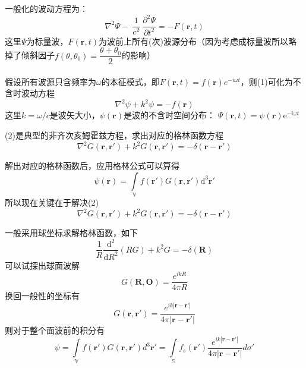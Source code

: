 \begin{slide}
    一般化的波动方程为：
    \begin{equation}
        \nabla^2 \Psi -\ \frac{1}{c^2}\ \frac{\partial^2 \Psi}{\partial t^2 }
        = - F(\bm{r},t)
    \end{equation}
    这里$\Psi$为标量波，$F(\bm{r},t)$为波前上所有(次)波源分布（因为考虑成标量波所以略掉了倾斜因子$f(\theta,\theta_0)=\dfrac{\theta+\theta_0}{2}$的影响）\\~\\
    假设所有波源只含频率为$\omega$的本征模式，即$F(\bm{r},t)=f(\bm{r})e^{-i\omega t}$，则(1)可化为不含时波动方程
    \begin{equation}
        \nabla^2 \psi + k^2 \psi = -  f(\bm{r})
    \end{equation}
    这里$k=\omega/c$是波矢大小，$\psi(\bm{r})$是波的不含时空间分布：
    $\Psi(\bm{r},t)=\psi(\bm{r})\mathrm{e}^{-i\omega t}$
\end{slide}

\begin{slide}
    (2)是典型的非齐次亥姆霍兹方程，求出对应的格林函数方程
    \begin{equation}
        \nabla^2 G(\bm{r},\bm{r}') + k^2 G(\bm{r},\bm{r}')
        = -\delta(\bm{r}-\bm{r}')
    \end{equation}

    解出对应的格林函数后，应用格林公式可以算得
    \begin{equation}
        \psi(\bm{r}) = \int\limits_{\mathbb{V}}f(\bm{r}')G(\bm{r},\bm{r}') \mathrm{d}^3\bm{r}'
    \end{equation}
    所以现在关键在于解决(2)
    \begin{equation*}
        \nabla^2 G(\bm{r},\bm{r}') + k^2 G(\bm{r},\bm{r}')
        = -\delta(\bm{r}-\bm{r}')
    \end{equation*}
\end{slide}

\begin{slide}
    一般采用球坐标求解格林函数，如下
    \begin{equation}
        \frac{1}{R} \frac {\mathrm{d}^2}{\mathrm{d} R^2} (RG) +k^2 G
        = -\delta(\bm{R})
    \end{equation}
    可以试探出球面波解
    \begin{equation}
        G(\bm{R},\bm{O}) = \frac{e^{ikR}}{4\pi R}
    \end{equation}
    换回一般性的坐标有
    \begin{equation}
        G(\bm{r},\bm{r}') = \frac{e^{ik |\bm{r}-\bm{r}' | }}{4\pi |\bm{r}-\bm{r}' |}
    \end{equation}
    则对于整个面波前的积分有
    \begin{equation}
        \psi= \int\limits_{\mathbb{V}} f(\bm{r}')G(\bm{r},\bm{r}')d^3\bm{r}' =\int\limits_{\mathbb{S}} f_s(\bm{r}')\frac{e^{i k |\bm{r}- \bm{r}'|}}{4\pi |\bm{r}-\bm{r}'|}d\sigma'
    \end{equation}
\end{slide}

